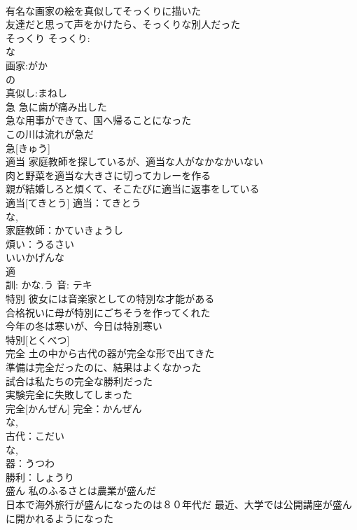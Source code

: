 \documentclass[8pt]{extreport}
\begin{document}
\begin{CJK}{UTF8}{min}
\\	有名な画家の絵を真似してそっくりに描いた 
\\	友達だと思って声をかけたら、そっくりな別人だった 
\\	そっくり			そっくり:
\\	な 
\\	画家:がか
\\	の 
\\	真似し:まねし
\\	急	急に歯が痛み出した 
\\	急な用事ができて、国へ帰ることになった 
\\	この川は流れが急だ 
\\	急[きゅう]						
\\	適当	家庭教師を探しているが、適当な人がなかなかいない 
\\	肉と野菜を適当な大きさに切ってカレーを作る 
\\	親が結婚しろと煩くて、そこたびに適当に返事をしている 
\\	適当[てきとう]			適当：てきとう
\\	な, 
\\	家庭教師：かていきょうし
\\	煩い：うるさい
\\	いいかげんな 
\\	適 
\\	訓: かな.う 音: テキ 
\\	特別	彼女には音楽家としての特別な才能がある 
\\	合格祝いに母が特別にごちそうを作ってくれた 
\\	今年の冬は寒いが、今日は特別寒い 
\\	特別[とくべつ]						
\\	完全	土の中から古代の器が完全な形で出てきた 
\\	準備は完全だったのに、結果はよくなかった 
\\	試合は私たちの完全な勝利だった 
\\	実験完全に失敗してしまった 
\\	完全[かんぜん]			完全：かんぜん
\\	な, 
\\	古代：こだい
\\	な, 
\\	器：うつわ
\\	勝利：しょうり
\\	盛ん	私のふるさとは農業が盛んだ 
\\	日本で海外旅行が盛んになったのは８０年代だ 最近、大学では公開講座が盛んに開かれるようになった 

\end{CJK}
\end{document}
